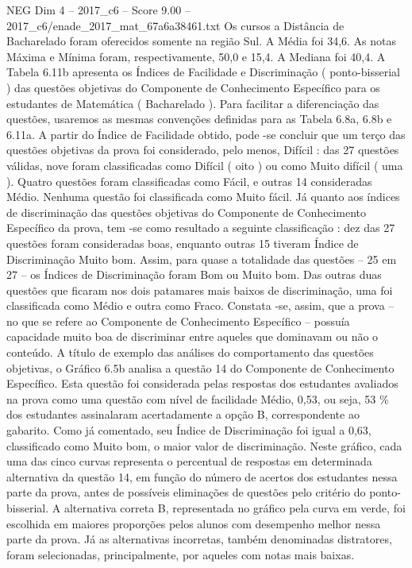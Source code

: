 \begin{textsample}{NEG Dim 4 – 2017\_c6 – Score 9.00 – 2017\_c6/enade\_2017\_mat\_67a6a38461.txt}
Os cursos a Distância de Bacharelado foram oferecidos somente na região Sul.
A Média foi 34,6.
As notas Máxima e Mínima foram, respectivamente, 50,0 e 15,4.
A Mediana foi 40,4.
A Tabela 6.11b apresenta os Índices de Facilidade e Discriminação ( ponto-bisserial ) das questões objetivas do Componente de Conhecimento Específico para os estudantes de Matemática ( Bacharelado ).
Para facilitar a diferenciação das questões, usaremos as mesmas convenções definidas para as Tabela 6.8a, 6.8b e 6.11a.
A partir do Índice de Facilidade obtido, pode -se concluir que um terço das questões objetivas da prova foi considerado, pelo menos, Difícil : das 27 questões válidas, nove foram classificadas como Difícil ( oito ) ou como Muito difícil ( uma ).
Quatro questões foram classificadas como Fácil, e outras 14 consideradas Médio.
Nenhuma questão foi classificada como Muito fácil.
Já quanto aos índices de discriminação das questões objetivas do Componente de Conhecimento Específico da prova, tem -se como resultado a seguinte classificação : dez das 27 questões foram consideradas boas, enquanto outras 15 tiveram Índice de Discriminação Muito bom.
Assim, para quase a totalidade das questões – 25 em 27 – os Índices de Discriminação foram Bom ou Muito bom.
Das outras duas questões que ficaram nos dois patamares mais baixos de discriminação, uma foi classificada como Médio e outra como Fraco.
Constata -se, assim, que a prova – no que se refere ao Componente de Conhecimento Específico – possuía capacidade muito boa de discriminar entre aqueles que dominavam ou não o conteúdo.
A título de exemplo das análises do comportamento das questões objetivas, o Gráfico 6.5b analisa a questão 14 do Componente de Conhecimento Específico.
Esta questão foi considerada pelas respostas dos estudantes avaliados na prova como uma questão com nível de facilidade Médio, 0,53, ou seja, 53 \% dos estudantes assinalaram acertadamente a opção B, correspondente ao gabarito.
Como já comentado, seu Índice de Discriminação foi igual a 0,63, classificado como Muito bom, o maior valor de discriminação.
Neste gráfico, cada uma das cinco curvas representa o percentual de respostas em determinada alternativa da questão 14, em função do número de acertos dos estudantes nessa parte da prova, antes de possíveis eliminações de questões pelo critério do ponto-bisserial.
A alternativa correta B, representada no gráfico pela curva em verde, foi escolhida em maiores proporções pelos alunos com desempenho melhor nessa parte da prova.
Já as alternativas incorretas, também denominadas distratores, foram selecionadas, principalmente, por aqueles com notas mais baixas.

\end{textsample}
